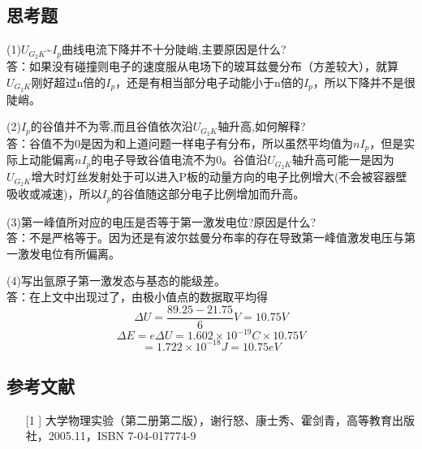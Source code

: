 \documentclass[UEF8]{ctexart}
\begin{document}
\begin{multicols}{2}
\subsection{思考题}
(1)$U_{G_{2}K}$\~{}$I_{p}$曲线电流下降并不十分陡峭,主要原因是什么?\\
答：如果没有碰撞则电子的速度服从电场下的玻耳兹曼分布（方差较大），就算$U_{G_{2}K}$刚好超过n倍的$I_{p}$，还是有相当部分电子动能小于n倍的$I_{p}$，所以下降并不是很陡峭。

(2)$I_{p}$的谷值并不为零,而且谷值依次沿$U_{G_{2}K}$轴升高,如何解释?\\
答：谷值不为0是因为和上道问题一样电子有分布，所以虽然平均值为$nI_{p}$，但是实际上动能偏离$nI_{p}$的电子导致谷值电流不为0。谷值沿$U_{G_{2}K}$轴升高可能一是因为$U_{G_{2}K}$增大时灯丝发射处于可以进入P板的动量方向的电子比例增大(不会被容器壁吸收或减速)，所以$I_{p}$的谷值随这部分电子比例增加而升高。

(3)第一峰值所对应的电压是否等于第一激发电位?原因是什么?\\
答：不是严格等于。因为还是有波尔兹曼分布率的存在导致第一峰值激发电压与第一激发电位有所偏离。

(4)写出氩原子第一激发态与基态的能级差。\\
答：在上文中出现过了，由极小值点的数据取平均得$$\Delta{U}=\dfrac{89.25-21.75}{6}V=10.75V$$
$$\Delta{E}=e\Delta{U}={1.602}\times{10^{-19}}C\times{10.75V}$$
$$=1.722\times10^{-18}J=10.75eV$$

\subsection{参考文献}
\begin{enumerate}
	\item[[1]] 大学物理实验（第二册第二版），谢行怒、康士秀、霍剑青，高等教育出版社，2005.11，ISBN 7-04-017774-9
\end{enumerate}


\end{multicols}
\end{document}
